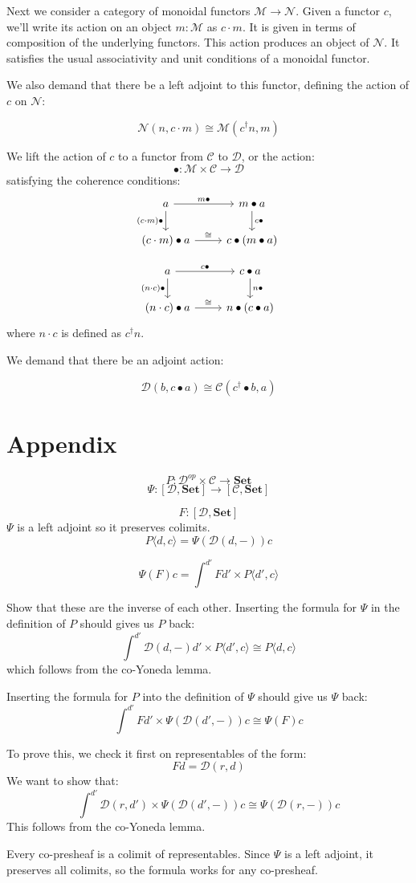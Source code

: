 \documentclass[11pt]{amsart}
\newcommand{\cat}[1]{\mathcal{#1}}%
\newcommand{\Cat}[1]{\mathbf{#1}}%
\newcommand{\Set}{\Cat{Set}}
\begin{document}
Next we consider a category of monoidal functors $\cat M \to \cat N$. Given a functor $c$, we'll write its action on an object $m \colon \cat M$ as $c \cdot m$. It is given in terms of composition of the underlying functors. This action produces an object of $\cat N$. It satisfies the usual associativity and unit conditions of a monoidal functor. 

We also demand that there be a left adjoint to this functor, defining the action of $c$ on $\cat N$:

\[ \cat N (n, c \cdot m) \cong \cat M (c^{\dagger} n, m) \]

We lift the action of $c$ to a functor from $\cat C$ to  $\cat D$, or the action:
\[ \bullet \colon \cat M \times \cat C \to \cat D \]
satisfying the coherence conditions:
\[
 \begin{tikzcd}
 a
 \arrow [r, "m \bullet"] 
 \arrow [d, "(c \cdot m) \bullet"']
 & m \bullet a
 \arrow [d, "c \bullet"]
 \\
 (c \cdot m) \bullet a
 \arrow [r, "\cong"]
 & c \bullet (m \bullet a)
 \end{tikzcd}
\]

\[
 \begin{tikzcd}
 a
 \arrow [r, "c \bullet"] 
 \arrow [d, "(n \cdot c) \bullet"']
 & c \bullet a
 \arrow [d, "n \bullet"]
 \\
 (n \cdot c) \bullet a
 \arrow [r, "\cong"]
 & n \bullet (c \bullet a)
 \end{tikzcd}
\]
where $n \cdot c$ is defined as $c^{\dagger} n$.

We demand that there be an adjoint action:

\[ \cat D (b, c \bullet a) \cong \cat C (c^{\dagger} \bullet b, a) \]

\section{Appendix}

\[P \colon \cat D^{op} \times \cat C \to \Set \]
\[ \Psi \colon [\cat D, \Set] \to [\cat C, \Set] \]


\[ F \colon [\cat D, \Set] \]
$\Psi$ is a left adjoint so it preserves colimits.
\[P \langle d, c \rangle = \Psi ( \cat D(d, -)) c \]


\[ \Psi (F) c = \int^{d'} F d' \times P \langle d', c \rangle \]

Show that these are the inverse of each other. Inserting the formula for $\Psi$ in the definition of $P$ should gives us $P$ back:
\[  \int^{d'} \cat D(d, -) d' \times P\langle d', c \rangle \cong  P \langle d, c \rangle \]
which follows from the co-Yoneda lemma.

Inserting the formula for $P$ into the definition of $\Psi$ should give us $\Psi$ back:
\[  \int^{d'} F d' \times \Psi(\cat D(d', -)) c  \cong \Psi (F) c  \]


To prove this, we check it first on representables of the form:
\[ F d = \cat D (r, d) \]
We want to show that:
\[ \int^{d'}  \cat D (r, d')  \times  \Psi(\cat D(d', -)) c \cong  \Psi ( \cat D (r, -) ) c\]
This follows from the co-Yoneda lemma.

Every co-presheaf is a colimit of representables. Since $\Psi$ is a left adjoint, it preserves all colimits, so the formula works for any co-presheaf.
\end{document}
